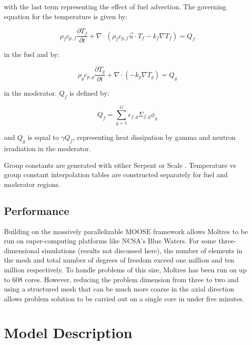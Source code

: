 \documentclass{article}
\let\Oldsection\section
\renewcommand{\section}{\FloatBarrier\Oldsection}
\let\Oldsubsection\subsection
\renewcommand{\subsection}{\FloatBarrier\Oldsubsection}
\begin{document}
with the last term representing the effect of fuel advection. The governing
equation for the temperature is given by:

\begin{equation}
  \rho_fc_{p,f}\frac{\partial T_f}{\partial t} + \nabla\cdot\left(\rho_f c_{p,f}
  \vec{u}\cdot T_f -k_f\nabla T_f\right) =  Q_f
  \label{eq:fuel_temp}
\end{equation}

in the fuel and by:

\begin{equation}
  \rho_gc_{p,g}\frac{\partial T_g}{\partial t} + \nabla\cdot\left(-k_g\nabla T_g\right) =  Q_g
  \label{eq:moderator_temp}
\end{equation}

in the moderator. $Q_f$ is defined by:

\begin{equation}
  Q_f = \sum_{g=1}^G \epsilon_{f,g}\Sigma_{f,g}\phi_g
  \label{eq:fuel_source}
\end{equation}

and $Q_g$ is equal to $\gamma Q_f$, representing heat dissipation by gamma and
neutron irradiation in the moderator.

Group constants are generated with either Serpent \cite{leppanen_serpent_2015} 
or Scale \cite{dehart_reactor_2011}. Temperature vs group constant 
interpolation tables are constructed separately for fuel and moderator regions.

\subsection{Performance}

Building on the massively parallelizable \gls{MOOSE} framework allows Moltres 
to be run on super-computing platforms like \gls{NCSA}'s Blue Waters. For some 
three-dimensional simulations (results not discussed here), the number of 
elements in the mesh and total number of degrees of freedom exceed one million 
and ten million respectively. To handle problems of this size, Moltres has been 
run on up to 608 cores. However, reducing the problem dimension from three to 
two and using a structured mesh that can be much more coarse in the axial 
direction allows problem solution to be carried out on a single core in under 
five minutes.

\section{Model Description}
\end{document}
